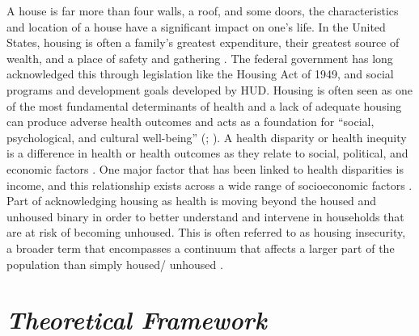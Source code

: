 A house is far more than four walls, a roof, and some doors, the characteristics and location of a house have a significant impact on one’s life. In the United States, housing is often a family’s greatest expenditure, their greatest source of wealth, and a place of safety and gathering \citep{braveman_housing_2011}. The federal government has long acknowledged this through legislation like the Housing Act of 1949, and social programs and development goals developed by HUD. Housing is often seen as one of the most fundamental determinants of health and a lack of adequate housing can produce adverse health outcomes and acts as a foundation for “social, psychological, and cultural well-being” (\citealp[p.17]{dalessandro_housing_2020}; \citealp{leifheit_building_2022}).  A health disparity or health inequity is a difference in health or health outcomes as they relate to social, political, and economic factors \citep{lutfiyya_rurality_2012}. One major factor that has been linked to health disparities is income, and this relationship exists across a wide range of socioeconomic factors \citep{canto_rural_2014}.  Part of acknowledging housing as health is moving beyond the housed and unhoused binary in order to better understand and intervene in households that are at risk of becoming unhoused. This is often referred to as housing insecurity, a broader term that encompasses a continuum that affects a larger part of the population than simply housed/ unhoused \citep{deluca_housing_2022}.

\section{\textit{Theoretical Framework}}

